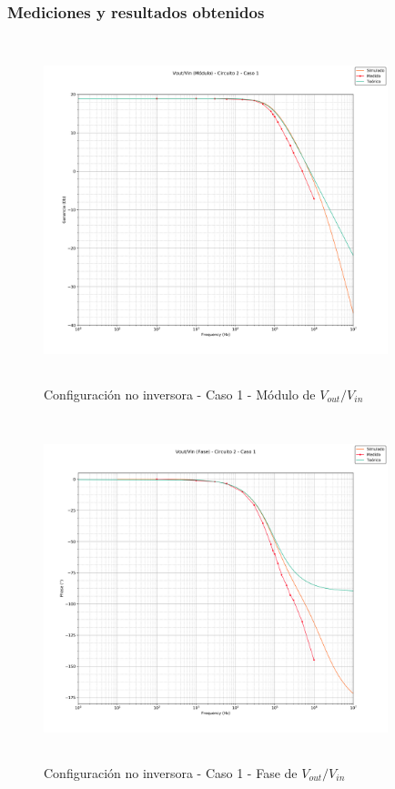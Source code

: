 \subsubsection*{Mediciones y resultados obtenidos} %

\begin{figure}[H] %
	\centering
	\includegraphics[width=10cm,height=10cm,keepaspectratio]{../EJ1/00GRAFICOS/c2c1/c2c1voviMod.png}
	\caption{Configuración no inversora - Caso 1 -  M\'odulo de $V_{out}/V_{in}$}
	\label{c2c1voviM}
\end{figure}

\begin{figure}[H] %
	\centering
	\includegraphics[width=10cm,height=10cm,keepaspectratio]{../EJ1/00GRAFICOS/c2c1/c2c1voviFASE.png}
	\caption{Configuración no inversora - Caso 1 - Fase de $V_{out}/V_{in}$}
	\label{c2c1voviP}
\end{figure}

